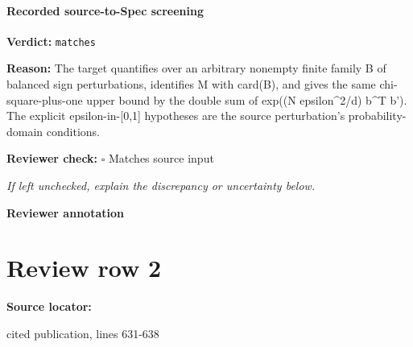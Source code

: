 \documentclass[10pt]{article}
\newcommand{\reviewerbox}{%
  \par\noindent\fbox{\parbox{0.96\linewidth}{\rule{0pt}{0.38in}}}\par
}
\newcommand{\reviewmatch}[1]{%
  \par\noindent\textbf{Reviewer check:} $\square$\; #1\par
  \noindent\emph{If left unchecked, explain the discrepancy or uncertainty below.}\par
}
\begin{document}
\paragraph{Recorded source-to-Spec screening}
\textbf{Verdict:} \texttt{matches}
\\
{\raggedright
\textbf{Reason:} The target quantifies over an arbitrary nonempty finite family B of balanced sign perturbations, identifies M with card(B), and gives the same chi-\allowbreak{}square-\allowbreak{}plus-\allowbreak{}one upper bound by the double sum of exp((N epsilon\textasciicircum{}2/\allowbreak{}d) b\textasciicircum{}T b').\allowbreak{} The explicit epsilon-\allowbreak{}in-\allowbreak{}[0,1] hypotheses are the source perturbation's probability-\allowbreak{}domain conditions.\allowbreak{}
\par}
\reviewmatch{Matches source input}
\noindent\textbf{Reviewer annotation}\par
\reviewerbox
\clearpage
\hypertarget{source-claim-9633f918d553c054}{}
\section*{Review row 2}
\textbf{Source locator:} {\footnotesize\raggedright cited publication, lines 631-\allowbreak{}638\par}
\end{document}
